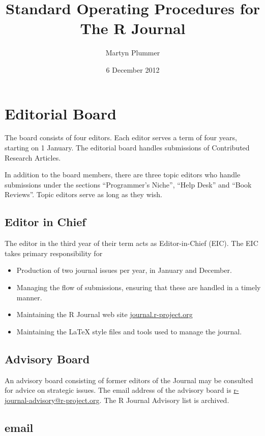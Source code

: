 \documentclass[11pt]{article}
\begin{document}
\title{Standard Operating Procedures for The R Journal}
\author{Martyn Plummer}
\date{6 December 2012}
\maketitle

\section{Editorial Board}

The board consists of four editors. Each editor serves a term of four
years, starting on 1 January. The editorial board handles submissions
of Contributed Research Articles.

In addition to the board members, there are three topic editors who
handle submissions under the sections ``Programmer's Niche'', ``Help
Desk'' and ``Book Reviews''. Topic editors serve as long as they wish.

\subsection{Editor in Chief}

The editor in the third year of their term acts as Editor-in-Chief
(EIC). The EIC takes primary responsibility for
\begin{itemize}
\item Production of two journal issues per year, in January and December.
\item Managing the flow of submissions, ensuring that these are
  handled in a timely manner.
\item Maintaining the R Journal web site \url{journal.r-project.org}
\item Maintaining the LaTeX style files and tools used to manage the
  journal.
\end{itemize}

\subsection{Advisory Board}

An advisory board consisting of former editors of the Journal may be
consulted for advice on strategic issues.  The email address of the
advisory board is \url{r-journal-advisory@r-project.org}. The R
Journal Advisory list is archived.

\subsection{email}
\end{document}
